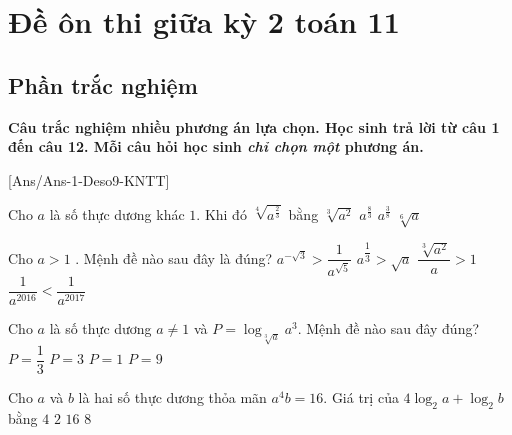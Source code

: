 \section{Đề ôn thi giữa kỳ 2 toán 11}
\subsection{Phần trắc nghiệm}
\textbf{Câu trắc nghiệm nhiều phương án lựa chọn. Học sinh trả lời từ
câu 1 đến câu 12. Mỗi câu hỏi học sinh \textit{chỉ chọn một} phương án.}

[Ans/Ans-1-Deso9-KNTT]
\hienthiloigiaiex
\begin{ex}%
	Cho $a$ là số thực dương khác $1$. Khi đó $\sqrt[4]{a^{\tfrac{2}{3}}}$ bằng
	\choice
	{$\sqrt[3]{a^2}$}
	{$a^{\tfrac{8}{3}}$}
	{$a^{\tfrac{3}{8}}$}
	{\True $\sqrt[6]{a}$}
\end{ex}

\begin{ex}%
	Cho $a>1$ . Mệnh đề nào sau đây là đúng?
	\choice
	{\True $a^{-\sqrt{3}}>\dfrac{1}{a^{\sqrt{5}}}$}
	{$a^{\dfrac{1}{3}}>\sqrt{a}$}
	{$\dfrac{\sqrt[3]{a^2}}{a}>1$}
	{$\dfrac{1}{a^{2016}}<\dfrac{1}{a^{2017}}$}
\end{ex}

\begin{ex}%
	Cho $a$ là số thực dương $a\ne 1$ và $P=\log_{\sqrt[3]{a}}a^3$. Mệnh đề nào sau đây đúng?
	\choice
	{$P=\dfrac{1}{3}$}
	{$P=3$}
	{$P=1$}
	{\True $P=9$}
\end{ex}

\begin{ex}%
	Cho $a$ và $b$ là hai số thực dương thỏa mãn $a^4b=16$. Giá trị của $4\log_2a+\log_2b$ bằng
	\choice
	{\True $4$}
	{$2$}
	{$16$}
	{$8$}
\end{ex}

